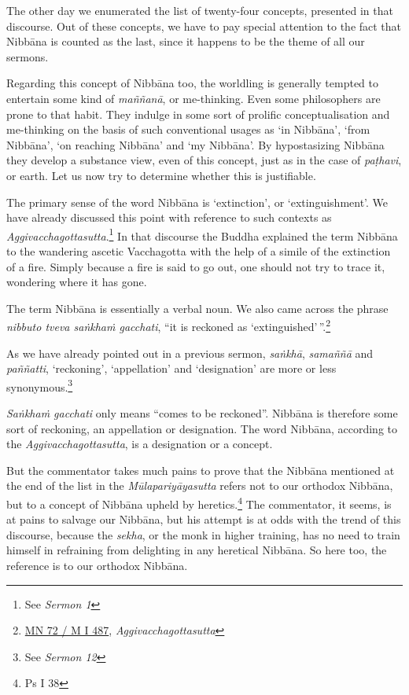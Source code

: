The other day we enumerated the list of twenty-four concepts, presented in that discourse. Out of these concepts, we have to pay special attention to the fact that Nibbāna is counted as the last, since it happens to be the theme of all our sermons.

Regarding this concept of Nibbāna too, the worldling is generally tempted to entertain some kind of \emph{maññanā}, or me-thinking. Even some philosophers are prone to that habit. They indulge in some sort of prolific conceptualisation and me-thinking on the basis of such conventional usages as `in Nibbāna', `from Nibbāna', `on reaching Nibbāna' and `my Nibbāna'. By hypostasizing Nibbāna they develop a substance view, even of this concept, just as in the case of \emph{paṭhavi}, or earth. Let us now try to determine whether this is justifiable.

The primary sense of the word Nibbāna is `extinction', or `extinguishment'. We have already discussed this point with reference to such contexts as \emph{Aggivacchagottasutta}.\footnote{See \emph{Sermon 1}} In that discourse the Buddha explained the term Nibbāna to the wandering ascetic Vacchagotta with the help of a simile of the extinction of a fire. Simply because a fire is said to go out, one should not try to trace it, wondering where it has gone.

The term Nibbāna is essentially a verbal noun. We also came across the phrase \emph{nibbuto tveva saṅkhaṁ gacchati}, ``it is reckoned as `extinguished'\,''.\footnote{\href{https://suttacentral.net/mn72/pli/ms}{MN 72 / M I 487}, \emph{Aggivacchagottasutta}}

As we have already pointed out in a previous sermon, \emph{saṅkhā}, \emph{samaññā} and \emph{paññatti}, `reckoning', `appellation' and `designation' are more or less synonymous.\footnote{See \emph{Sermon 12}}

\emph{Saṅkhaṁ gacchati} only means ``comes to be reckoned''. Nibbāna is therefore some sort of reckoning, an appellation or designation. The word Nibbāna, according to the \emph{Aggivacchagottasutta}, is a designation or a concept.

But the commentator takes much pains to prove that the Nibbāna mentioned at the end of the list in the \emph{Mūlapariyāyasutta} refers not to our orthodox Nibbāna, but to a concept of Nibbāna upheld by heretics.\footnote{Ps I 38} The commentator, it seems, is at pains to salvage our Nibbāna, but his attempt is at odds with the trend of this discourse, because the \emph{sekha}, or the monk in higher training, has no need to train himself in refraining from delighting in any heretical Nibbāna. So here too, the reference is to our orthodox Nibbāna.

